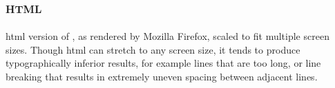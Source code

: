 \begin{center}
\end{center}



\clearpage



\subsection{\textsc{html}}

\gls{html} version of \cite{Pinkney2011}, as rendered by Mozilla Firefox, scaled to fit multiple screen sizes. Though \gls{html} can stretch to any screen size, it tends to produce typographically inferior results, for example lines that are too long, or line breaking that results in extremely uneven spacing between adjacent lines.

